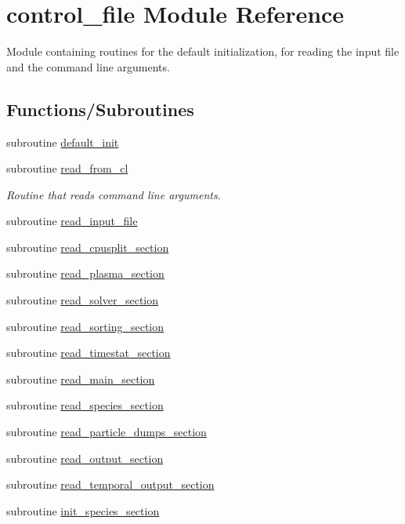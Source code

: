 \hypertarget{namespacecontrol__file}{}\section{control\+\_\+file Module Reference}
\label{namespacecontrol__file}


Module containing routines for the default initialization, for reading the input file and the command line arguments.  


\subsection*{Functions/\+Subroutines}
\begin{DoxyCompactItemize}
\item 
subroutine \hyperlink{namespacecontrol__file_a80a60361388cc26b8fe06e18e81dc50a}{default\+\_\+init}
\item 
subroutine \hyperlink{namespacecontrol__file_afa9aa95463bcdfe5197ba2ac94793e9f}{read\+\_\+from\+\_\+cl}
\begin{DoxyCompactList}\small\item\em Routine that reads command line arguments. \end{DoxyCompactList}\item 
subroutine \hyperlink{namespacecontrol__file_a12ed3f461d585d4199bd6d079a5d74c3}{read\+\_\+input\+\_\+file}
\item 
subroutine \hyperlink{namespacecontrol__file_a488db4847d7ab565187470e915cfcb81}{read\+\_\+cpusplit\+\_\+section}
\item 
subroutine \hyperlink{namespacecontrol__file_ac9b9d61786de32de87c8ddee39a0ac8c}{read\+\_\+plasma\+\_\+section}
\item 
subroutine \hyperlink{namespacecontrol__file_ac65dc6ab5ac3863b22d480b2f9ce1b3b}{read\+\_\+solver\+\_\+section}
\item 
subroutine \hyperlink{namespacecontrol__file_a76aeb0fb2e335ba8495d28bbca1bd6e4}{read\+\_\+sorting\+\_\+section}
\item 
subroutine \hyperlink{namespacecontrol__file_af10502f8b6dd7152860ce78ddc0f4ff3}{read\+\_\+timestat\+\_\+section}
\item 
subroutine \hyperlink{namespacecontrol__file_a88006372b7d91fbde08778111f02fd97}{read\+\_\+main\+\_\+section}
\item 
subroutine \hyperlink{namespacecontrol__file_a76b277dd7c336fdc4ff255f1f1e23365}{read\+\_\+species\+\_\+section}
\item 
subroutine \hyperlink{namespacecontrol__file_abe9d14779d86f200329241b34ba94b33}{read\+\_\+particle\+\_\+dumps\+\_\+section}
\item 
subroutine \hyperlink{namespacecontrol__file_a8beaa20ec4cf16cbc533182a9500f5a3}{read\+\_\+output\+\_\+section}
\item 
subroutine \hyperlink{namespacecontrol__file_a37549c37c459c5e8ffa18cb84a7116f8}{read\+\_\+temporal\+\_\+output\+\_\+section}
\item 
subroutine \hyperlink{namespacecontrol__file_a1cd090a937bb673f043a85221c21f8a7}{init\+\_\+species\+\_\+section}
\end{DoxyCompactItemize}
